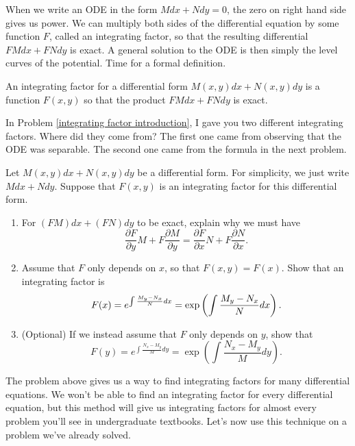 When we write an ODE in the form $Mdx+Ndy=0$, the zero on right hand side gives us power. We can multiply both sides of the differential equation by some function $F$, called an integrating factor, so that the resulting differential $FMdx+FNdy$ is exact. A general solution to the ODE is then simply the level curves of the potential. Time for a formal definition.

\begin{definition}
 An integrating factor for a differential form $M(x,y)dx+N(x,y)dy$ is a function $F(x,y)$ so that the product $FMdx+FNdy$ is exact.
\end{definition}

In Problem \ref{integrating factor introduction}, I gave you two different integrating factors. Where did they come from? The first one came from observing that the ODE was separable. The second one came from the formula in the next problem.

\begin{problem}\label{integrating factor that depends only on x}
Let $M(x,y)dx+N(x,y)dy$ be a differential form.  For simplicity, we just write $Mdx+Ndy$.  Suppose that $F(x,y)$ is an integrating factor for this differential form.
\begin{enumerate}
 \item {}%
For $(FM)dx+(FN)dy$ to be exact, explain why we must have 
$$
\dfrac{\partial F}{\partial y}M+F\dfrac{\partial M}{\partial y} 
= 
\dfrac{\partial F}{\partial x}N+F\dfrac{\partial N}{\partial x} 
.$$
\item 
{}%
Assume that $F$ only depends on $x$, so that $F(x,y)=F(x)$. Show that an integrating factor is
$$\displaystyle F(x)=e^{\int \frac{M_y-N_x}{N} dx} = \exp\left(\int \frac{M_y-N_x}{N} dx\right).$$
\item (Optional) If we instead assume that $F$ only depends on $y$, show that 
$$F(y)=e^{\int \frac{N_x-M_y}{M} dy} = \exp\left(\int \frac{N_x-M_y}{M} dy\right).$$
\end{enumerate}
 
\end{problem}

The problem above gives us a way to find integrating factors for many differential equations. We won't be able to find an integrating factor for every differential equation, but this method will give us integrating factors for almost every problem you'll see in undergraduate textbooks. Let's now use this technique on a problem we've already solved.

